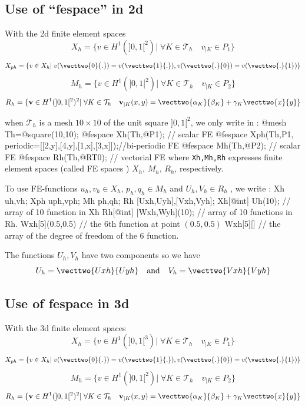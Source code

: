 \documentclass[a4paper,twoside,12pt]{book}
\begin{document}
\subsection{Use of ``fespace'' in 2d}
With the 2d finite element spaces
$$  X_{h} = \{ v \in H^{1}(]0,1[^2) |\; \forall K \in \mathcal{T}_{h}
\quad v_{|K} \in
P_{1} \}$$
$$ X_{ph} = \{  v \in X_{h} |\; v(\vecttwo{0}{.} ) =  v(\vecttwo{1}{.}) , v(\vecttwo{.}{0} ) =  v(\vecttwo{.}{1} )  \}$$
$$  M_{h} = \{ v \in H^{1}(]0,1[^2) |\; \forall K \in \mathcal{T}_{h}
\quad v_{|K} \in
P_{2} \}$$
$$  R_{h} = \{ \mathbf{v} \in H^{1}(]0,1[^2)^{2} |\; \forall K \in \mathcal{T}_{h}
\quad
 \mathbf{v}_{|K}(x,y) =
         \vecttwo{\alpha_{K}}{\beta_{K}} + \gamma_{K}\vecttwo{x}{y} \}$$

when $\mathcal{T}_h$ is a mesh $10\times 10$ of the unit square $]0,1[^2$,
we only write in \freefempp :
\bFF
@mesh Th=@square(10,10);
@fespace Xh(Th,@P1);      //  scalar FE
@fespace Xph(Th,P1,
         periodic=[[2,y],[4,y],[1,x],[3,x]]);//bi-periodic FE
@fespace Mh(Th,@P2);      //  scalar FE
@fespace Rh(Th,@RT0);     //  vectorial FE
\eFF
where \texttt{Xh,Mh,Rh} expresses finite element spaces (called FE spaces
) $X_h,\, M_h,\, R_h$, respectively.

To use FE-functions
$ u_{h},v_{h} \in X_{h} $,  $ p_{h},q_{h} \in M_{h} $
and $U_{h},V_{h} \in R_{h}$
, we write :
\bFF
  Xh uh,vh;
  Xph uph,vph;
  Mh ph,qh;
  Rh [Uxh,Uyh],[Vxh,Vyh];
  Xh[@int] Uh(10); //  array of 10 function in Xh
  Rh[@int] [Wxh,Wyh](10); //  array of 10 functions in Rh.
  Wxh[5](0.5,0.5)  // the 6th  function at point $(0.5,0.5)$
  Wxh[5][] // the array of the degree of freedom of the 6 function.
\eFF

The functions $U_{h},V_{h}$ have two components so we have
$$U_{h}=\vecttwo{Uxh}{Uyh}  \quad \mbox{and}\quad V_{h}=\vecttwo{Vxh}{Vyh}$$

\subsection{Use of fespace in 3d}
With the 3d finite element spaces
$$  X_{h} = \{ v \in H^{1}(]0,1[^3) |\; \forall K \in \mathcal{T}_{h}
\quad v_{|K} \in
P_{1} \}$$
$$ X_{ph} = \{  v \in X_{h} |\; v(\vecttwo{0}{.} ) =  v(\vecttwo{1}{.}) , v(\vecttwo{.}{0} ) =  v(\vecttwo{.}{1} )  \}$$
$$  M_{h} = \{ v \in H^{1}(]0,1[^2) |\; \forall K \in \mathcal{T}_{h}
\quad v_{|K} \in
P_{2} \}$$
$$  R_{h} = \{ \mathbf{v} \in H^{1}(]0,1[^2)^{2} |\; \forall K \in \mathcal{T}_{h}
\quad
 \mathbf{v}_{|K}(x,y) =
         \vecttwo{\alpha_{K}}{\beta_{K}} + \gamma_{K}\vecttwo{x}{y} \}$$
\end{document}
